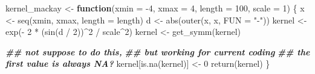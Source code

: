 \documentclass[
]{article}
\newenvironment{Shaded}{\begin{snugshade}}{\end{snugshade}}
\newcommand{\AttributeTok}[1]{\textcolor[rgb]{0.77,0.63,0.00}{#1}}
\newcommand{\ControlFlowTok}[1]{\textcolor[rgb]{0.13,0.29,0.53}{\textbf{#1}}}
\newcommand{\DecValTok}[1]{\textcolor[rgb]{0.00,0.00,0.81}{#1}}
\newcommand{\DocumentationTok}[1]{\textcolor[rgb]{0.56,0.35,0.01}{\textbf{\textit{#1}}}}
\newcommand{\FunctionTok}[1]{\textcolor[rgb]{0.00,0.00,0.00}{#1}}
\newcommand{\NormalTok}[1]{#1}
\newcommand{\OtherTok}[1]{\textcolor[rgb]{0.56,0.35,0.01}{#1}}
\newcommand{\SpecialCharTok}[1]{\textcolor[rgb]{0.00,0.00,0.00}{#1}}
\newcommand{\StringTok}[1]{\textcolor[rgb]{0.31,0.60,0.02}{#1}}
\begin{document}
\begin{Shaded}
\begin{Highlighting}[]
\NormalTok{kernel\_mackay }\OtherTok{\textless{}{-}} \ControlFlowTok{function}\NormalTok{(}\AttributeTok{xmin =} \SpecialCharTok{{-}}\DecValTok{4}\NormalTok{, }
                          \AttributeTok{xmax =} \DecValTok{4}\NormalTok{, }
                          \AttributeTok{length =} \DecValTok{100}\NormalTok{,}
                          \AttributeTok{scale =} \DecValTok{1}\NormalTok{) \{}
\NormalTok{  x }\OtherTok{\textless{}{-}} \FunctionTok{seq}\NormalTok{(xmin, xmax, }\AttributeTok{length =}\NormalTok{ length)}
\NormalTok{  d }\OtherTok{\textless{}{-}} \FunctionTok{abs}\NormalTok{(}\FunctionTok{outer}\NormalTok{(x, x, }\AttributeTok{FUN =} \StringTok{"{-}"}\NormalTok{))}
\NormalTok{  kernel }\OtherTok{\textless{}{-}} \FunctionTok{exp}\NormalTok{(}\SpecialCharTok{{-}} \DecValTok{2} \SpecialCharTok{*}\NormalTok{ (}\FunctionTok{sin}\NormalTok{(d }\SpecialCharTok{/} \DecValTok{2}\NormalTok{))}\SpecialCharTok{\^{}}\DecValTok{2} \SpecialCharTok{/}\NormalTok{ scale}\SpecialCharTok{\^{}}\DecValTok{2}\NormalTok{)}
\NormalTok{  kernel }\OtherTok{\textless{}{-}} \FunctionTok{get\_symm}\NormalTok{(kernel)}
  
  \DocumentationTok{\#\# not suppose to do this, }
  \DocumentationTok{\#\# but working for current coding}
  \DocumentationTok{\#\# the first value is always NA? }
\NormalTok{  kernel[}\FunctionTok{is.na}\NormalTok{(kernel)] }\OtherTok{\textless{}{-}} \DecValTok{0}
  \FunctionTok{return}\NormalTok{(kernel)}
\NormalTok{\}}
\end{Highlighting}
\end{Shaded}
\end{document}
